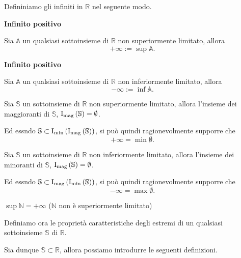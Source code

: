 Defininiamo gli infiniti in $\mathbb{R}$ nel seguente modo.

\begin{definition}
    \textbf{Infinito positivo}

    Sia $\mathbb{A}$ un qualsiasi sottoinsieme di $\mathbb{R}$ non superiormente limitato, allora
    \[ +\infty := \sup\mathbb{A}. \]
\end{definition}

\begin{definition}
    \textbf{Infinito positivo}

    Sia $\mathbb{A}$ un qualsiasi sottoinsieme di $\mathbb{R}$ non inferiormente limitato, allora
    \[ -\infty := \inf\mathbb{A}. \]
\end{definition}

\begin{observation}
    Sia $\mathbb{S}$ un sottoinsieme di $\mathbb{R}$ non superiormente limitato, allora
    l'insieme dei maggioranti di $\mathbb{S}$, $\operatorname{I_{mag}\left(\mathbb{S}\right)} = \emptyset$.

    Ed essndo $\mathbb{S}\subset \operatorname{I_{min}\left(\operatorname{I_{mag}\left(\mathbb{S}\right)}\right)}$, si può quindi ragionevolmente
    supporre che \[+\infty = \min\emptyset. \]
\end{observation}

\begin{observation}
    Sia $\mathbb{S}$ un sottoinsieme di $\mathbb{R}$ non inferiormente limitato, allora
    l'insieme dei minoranti di $\mathbb{S}$, $\operatorname{I_{mag}\left(\mathbb{S}\right)} = \emptyset$.

    Ed essndo $\mathbb{S}\subset \operatorname{I_{mag}\left(\operatorname{I_{min}\left(\mathbb{S}\right)}\right)}$, si può quindi ragionevolmente
    supporre che \[-\infty = \max\emptyset.\]
\end{observation}

\begin{proposition}
    $\sup\mathbb{N} = +\infty$ ($\mathbb{N}$ non è superiormente limitato)
\end{proposition}

\begin{demonstration}
    
\end{demonstration}

Definiamo ora le proprietà caratteristiche degli estremi di un qualsiasi
sottoinsieme $\mathbb{S}$ di $\mathbb{R}$.

Sia dunque $\mathbb{S} \subset \mathbb{R}$, allora possiamo introdurre le seguenti definizioni.

